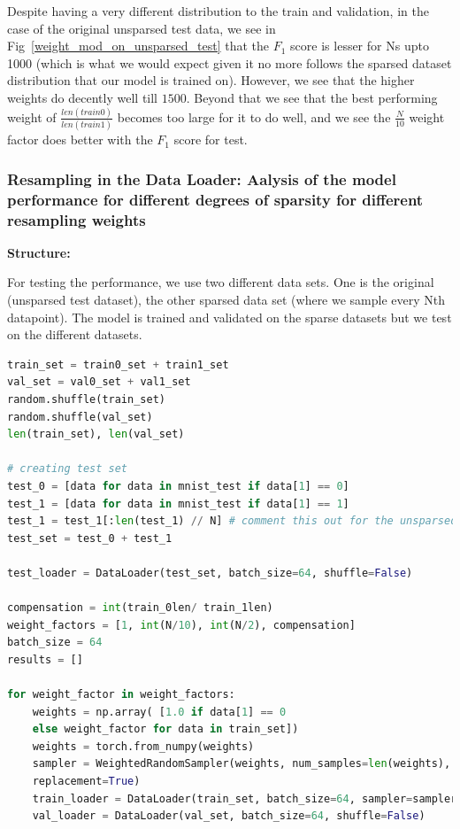 \begin{solve}
\begin{enumerate}
    Despite having a very different distribution to the train and validation, in the case of the original unsparsed test data, we see in Fig~\ref{weight_mod_on_unsparsed_test} that the $F_1$ score is lesser for Ns upto 1000 (which is what we would expect given it no more follows the sparsed dataset distribution that our model is trained on). However, we see that the higher weights do decently well till $1500$. Beyond that we see that the best performing weight of $\frac{len(train 0)}{len(train 1)}$ becomes too large for it to do well, and we see the $ \frac{N}{10}$ weight factor does better with the $F_1$ score for test. 

\end{enumerate}


\subsubsection{Resampling in the Data Loader: Aalysis of the model performance for different degrees of sparsity for different resampling weights }

\textbf{Structure:} 

For testing the performance, we use two different data sets. One is the original (unsparsed test dataset), the other sparsed data set (where we sample every Nth datapoint). The model is trained and validated on the sparse datasets but we test on the different datasets.

\begin{lstlisting}[language=python, title = Adjusting the weight in the loss function]
train_set = train0_set + train1_set
val_set = val0_set + val1_set
random.shuffle(train_set)
random.shuffle(val_set)
len(train_set), len(val_set)

# creating test set
test_0 = [data for data in mnist_test if data[1] == 0]
test_1 = [data for data in mnist_test if data[1] == 1]
test_1 = test_1[:len(test_1) // N] # comment this out for the unsparsed
test_set = test_0 + test_1

test_loader = DataLoader(test_set, batch_size=64, shuffle=False)

compensation = int(train_0len/ train_1len)
weight_factors = [1, int(N/10), int(N/2), compensation]
batch_size = 64
results = []

for weight_factor in weight_factors:
    weights = np.array( [1.0 if data[1] == 0 
    else weight_factor for data in train_set])
    weights = torch.from_numpy(weights)
    sampler = WeightedRandomSampler(weights, num_samples=len(weights), 
    replacement=True)
    train_loader = DataLoader(train_set, batch_size=64, sampler=sampler)
    val_loader = DataLoader(val_set, batch_size=64, shuffle=False)
\end{lstlisting}


\end{solve}
